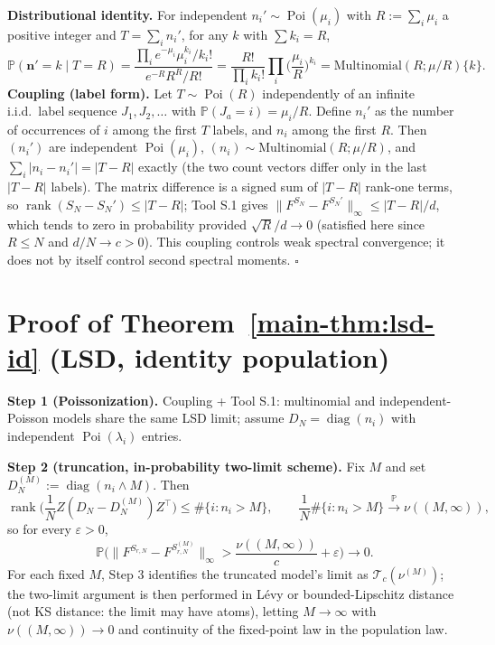 \textbf{Distributional identity.} For independent $n_i'\sim\operatorname{Poi}(\mu_i)$ with $R:=\sum_i\mu_i$ a positive integer and $T=\sum_in_i'$, for any $k$ with $\sum k_i=R$,
\[
\mathbb P(\boldsymbol n'=k\mid T=R)=\frac{\prod_ie^{-\mu_i}\mu_i^{k_i}/k_i!}{e^{-R}R^R/R!}=\frac{R!}{\prod_ik_i!}\prod_i\Big(\frac{\mu_i}{R}\Big)^{k_i}=\mathrm{Multinomial}(R;\mu/R)\{k\}.
\]
\textbf{Coupling (label form).} Let $T\sim\operatorname{Poi}(R)$ independently of an infinite i.i.d.\ label sequence $J_1,J_2,\dots$ with $\mathbb P(J_a=i)=\mu_i/R$. Define $n_i'$ as the number of occurrences of $i$ among the first $T$ labels, and $n_i$ among the first $R$. Then $(n_i')$ are independent $\operatorname{Poi}(\mu_i)$, $(n_i)\sim\mathrm{Multinomial}(R;\mu/R)$, and $\sum_i|n_i-n_i'|=|T-R|$ exactly (the two count vectors differ only in the last $|T-R|$ labels). The matrix difference is a signed sum of $|T-R|$ rank-one terms, so $\operatorname{rank}(S_N-S_N')\le|T-R|$; Tool S.1 gives $\|F^{S_N}-F^{S_N'}\|_\infty\le|T-R|/d$, which tends to zero in probability provided $\sqrt R/d\to0$ (satisfied here since $R\le N$ and $d/N\to c>0$). This coupling controls weak spectral convergence; it does not by itself control second spectral moments. $\square$

\section{Proof of Theorem~\ref{main-thm:lsd-id} (LSD, identity population)}\label{sec:S6}

\textbf{Step 1 (Poissonization).} Coupling + Tool S.1: multinomial and independent-Poisson models share the same LSD limit; assume $D_N=\operatorname{diag}(n_i)$ with independent $\operatorname{Poi}(\lambda_i)$ entries.

\textbf{Step 2 (truncation, in-probability two-limit scheme).} Fix $M$ and set $D_N^{(M)}:=\operatorname{diag}(n_i\wedge M)$. Then
\[
\operatorname{rank}\Big(\frac1N Z(D_N-D_N^{(M)})Z^\top\Big)\le\#\{i:n_i>M\},\qquad \frac1N\#\{i:n_i>M\}\xrightarrow{\mathbb P}\nu((M,\infty)),
\]
so for every $\varepsilon>0$,
\[
\mathbb P\Big(\big\|F^{S_{r,N}}-F^{S_{r,N}^{(M)}}\big\|_\infty>\frac{\nu((M,\infty))}{c}+\varepsilon\Big)\to0.
\]
For each fixed $M$, Step 3 identifies the truncated model's limit as $\mathcal T_c(\nu^{(M)})$; the two-limit argument is then performed in Lévy or bounded-Lipschitz distance (not KS distance: the limit may have atoms), letting $M\to\infty$ with $\nu((M,\infty))\to0$ and continuity of the fixed-point law in the population law.

